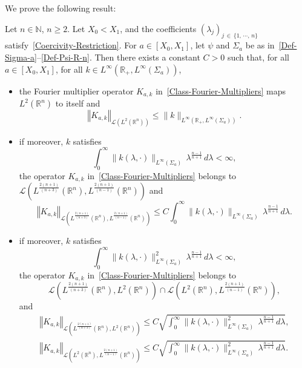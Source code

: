 \documentclass[10pt]{amsart}
\theoremstyle{definition}\newtheorem{defi}[theo]{Definition}\newtheorem{rema}[theo]{Remark}\newtheorem{exam}[theo]{Example}\newtheorem{exem}[theo]{Example}\newtheorem{nota}[theo]{Notation}
\newcommand{\scL}{\mathscr{L}}
\newcommand*\R{\mathbb{R}}
\newcommand*\N{\mathbb{N}}
\newcommand{\norm}[1]{\left\Vert#1\right\Vert}
\renewcommand{\leq}{\leqslant}
\renewcommand{\geq}{\geqslant}
\begin{document}
We prove the following result:
\begin{prop}\label{Prop-Est-Fourier-Op}
Let $n\in \N$, $n\geq 2$. Let $X_0 <X_1$, and the coefficients $(\lambda_j)_{j\, \in\,\{1, \,\cdots,\,n\}}$ satisfy~\eqref{Coercivity-Restriction}. For $a \in [X_0,X_1]$, let $\psi$ and $\Sigma_a$ be as in~\eqref{Def-Sigma-a}--\eqref{Def-Psi-R-n}. Then there exists a constant $C>0$ such that, for all $a \in [X_0,X_1]$, for all $k \in L^\infty(\R_+, L^\infty(\Sigma_a))$,
\begin{itemize}
\item the Fourier multiplier operator $K_{a,k}$ in~\eqref{Class-Fourier-Multipliers} maps $L^2(\R^{n})$ to itself and
\begin{equation}\label{Est-K-a-k-L2-L2}
\norm{K_{a,k}}_{\scL\left(L^2(\R^n)\right)}
\leq
\| k \|_{L^\infty\left(\R_+, L^\infty(\Sigma_a)\right)}.
\end{equation}
\item if moreover, $k$ satisfies
\[
\int_0^\infty \| k(\lambda, \cdot)\|_{L^\infty(\Sigma_a)} \, \lambda^{\frac{n-1}{n+1}} \, d\lambda < \infty,
\]
the operator $K_{a,k}$ in~\eqref{Class-Fourier-Multipliers} belongs to $\scL(L^{\frac{2(n+1)}{(n+3)}}(\R^n),L^{\frac{2(n+1)}{(n-1)}}(\R^n))$ and
\begin{equation}\label{Est-K-a-k-Lp-Lp'}
\norm{K_{a,k}}_{\scL\left(L^{\frac{2(n+1)}{(n+3)}}\left(\R^n\right),L^{\frac{2(n+1)}{(n-1)}}\left(\R^n\right)\right)}
\leq C \int_0^\infty \| k(\lambda, \cdot)\|_{L^\infty(\Sigma_a)} \, \lambda^{\frac{n-1}{n+1}} \, d\lambda.
\end{equation}
\item if moreover, $k$ satisfies
\[
\int_0^\infty \| k(\lambda, \cdot)\|_{L^\infty(\Sigma_a)}^2 \, \lambda^{\frac{n-1}{n+1}} \, d\lambda < \infty,
\]
the operator $K_{a,k}$ in~\eqref{Class-Fourier-Multipliers} belongs to
\[
\scL\left(L^{\frac{2(n+1)}{(n+3)}}\left(\R^n\right),L^{2}\left(\R^n\right)\right) \cap \scL\left(L^{2}\left(\R^n\right), L^{\frac{2(n+1)}{(n-1)}}\left(\R^n\right)\right),
\]
and
\begin{align}
\norm{K_{a,k}}_{\scL\left(L^{\frac{2(n+1)}{(n+3)}}\left(\R^n\right),L^{2}\left(\R^n\right)\right)}
\leq C \sqrt{\int_0^\infty \| k(\lambda, \cdot)\|_{L^\infty(\Sigma_a)}^2 \, \lambda^{\frac{n-1}{n+1}} \, d\lambda},
\label{Est-K-a-k-Lp-L2}
\\
\norm{K_{a,k}}_{\scL\left(L^{2}\left(\R^n\right), L^{\frac{2(n+1)}{(n-1)}}\left(\R^n\right)\right)}
\leq C \sqrt{\int_0^\infty \| k(\lambda, \cdot)\|_{L^\infty(\Sigma_a)}^2 \, \lambda^{\frac{n-1}{n+1}} \, d\lambda}.\label{Est-K-a-k-L2-Lp'}
\end{align}
\end{itemize}
\end{prop}
\end{document}
